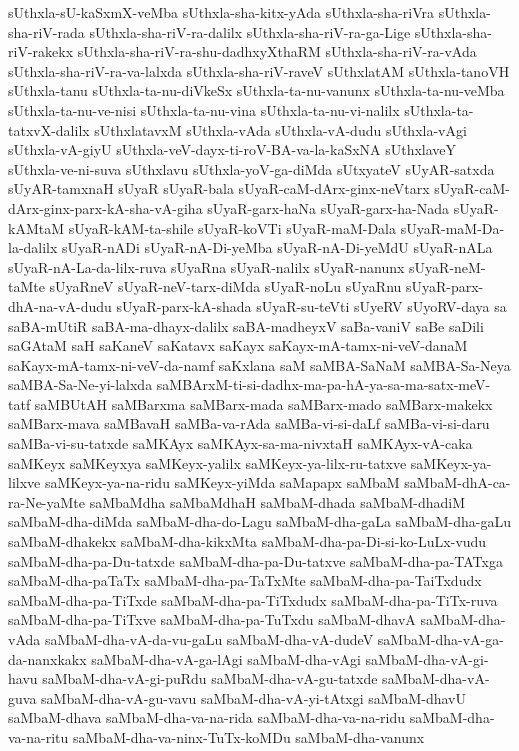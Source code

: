 {sUthxla-sU-kaSxmX-veMba
sUthxla-sha-kitx-yAda
sUthxla-sha-riVra
sUthxla-sha-riV-rada
sUthxla-sha-riV-ra-dalilx
sUthxla-sha-riV-ra-ga-Lige
sUthxla-sha-riV-rakekx
sUthxla-sha-riV-ra-shu-dadhxyXthaRM
sUthxla-sha-riV-ra-vAda
sUthxla-sha-riV-ra-va-lalxda
sUthxla-sha-riV-raveV
sUthxlatAM
sUthxla-tanoVH
sUthxla-tanu
sUthxla-ta-nu-diVkeSx
sUthxla-ta-nu-vanunx
sUthxla-ta-nu-veMba
sUthxla-ta-nu-ve-nisi
sUthxla-ta-nu-vina
sUthxla-ta-nu-vi-nalilx
sUthxla-ta-tatxvX-dalilx
sUthxlatavxM
sUthxla-vAda
sUthxla-vA-dudu
sUthxla-vAgi
sUthxla-vA-giyU
sUthxla-veV-dayx-ti-roV-BA-va-la-kaSxNA
sUthxlaveY
sUthxla-ve-ni-suva
sUthxlavu
sUthxla-yoV-ga-diMda
sUtxyateV
sUyAR-satxda
sUyAR-tamxnaH
sUyaR
sUyaR-bala
sUyaR-caM-dArx-ginx-neVtarx
sUyaR-caM-dArx-ginx-parx-kA-sha-vA-giha
sUyaR-garx-haNa
sUyaR-garx-ha-Nada
sUyaR-kAMtaM
sUyaR-kAM-ta-shile
sUyaR-koVTi
sUyaR-maM-Dala
sUyaR-maM-Da-la-dalilx
sUyaR-nADi
sUyaR-nA-Di-yeMba
sUyaR-nA-Di-yeMdU
sUyaR-nALa
sUyaR-nA-La-da-lilx-ruva
sUyaRna
sUyaR-nalilx
sUyaR-nanunx
sUyaR-neM-taMte
sUyaRneV
sUyaR-neV-tarx-diMda
sUyaR-noLu
sUyaRnu
sUyaR-parx-dhA-na-vA-dudu
sUyaR-parx-kA-shada
sUyaR-su-teVti
sUyeRV
sUyoRV-daya
sa
saBA-mUtiR
saBA-ma-dhayx-dalilx
saBA-madheyxV
saBa-vaniV
saBe
saDili
saGAtaM
saH
saKaneV
saKatavx
saKayx
saKayx-mA-tamx-ni-veV-danaM
saKayx-mA-tamx-ni-veV-da-namf
saKxlana
saM
saMBA-SaNaM
saMBA-Sa-Neya
saMBA-Sa-Ne-yi-lalxda
saMBArxM-ti-si-dadhx-ma-pa-hA-ya-sa-ma-satx-meV-tatf
saMBUtAH
saMBarxma
saMBarx-mada
saMBarx-mado
saMBarx-makekx
saMBarx-mava
saMBavaH
saMBa-va-rAda
saMBa-vi-si-daLf
saMBa-vi-si-daru
saMBa-vi-su-tatxde
saMKAyx
saMKAyx-sa-ma-nivxtaH
saMKAyx-vA-caka
saMKeyx
saMKeyxya
saMKeyx-yalilx
saMKeyx-ya-lilx-ru-tatxve
saMKeyx-ya-lilxve
saMKeyx-ya-na-ridu
saMKeyx-yiMda
saMapapx
saMbaM
saMbaM-dhA-ca-ra-Ne-yaMte
saMbaMdha
saMbaMdhaH
saMbaM-dhada
saMbaM-dhadiM
saMbaM-dha-diMda
saMbaM-dha-do-Lagu
saMbaM-dha-gaLa
saMbaM-dha-gaLu
saMbaM-dhakekx
saMbaM-dha-kikxMta
saMbaM-dha-pa-Di-si-ko-LuLx-vudu
saMbaM-dha-pa-Du-tatxde
saMbaM-dha-pa-Du-tatxve
saMbaM-dha-pa-TATxga
saMbaM-dha-paTaTx
saMbaM-dha-pa-TaTxMte
saMbaM-dha-pa-TaiTxdudx
saMbaM-dha-pa-TiTxde
saMbaM-dha-pa-TiTxdudx
saMbaM-dha-pa-TiTx-ruva
saMbaM-dha-pa-TiTxve
saMbaM-dha-pa-TuTxdu
saMbaM-dhavA
saMbaM-dha-vAda
saMbaM-dha-vA-da-vu-gaLu
saMbaM-dha-vA-dudeV
saMbaM-dha-vA-ga-da-nanxkakx
saMbaM-dha-vA-ga-lAgi
saMbaM-dha-vAgi
saMbaM-dha-vA-gi-havu
saMbaM-dha-vA-gi-puRdu
saMbaM-dha-vA-gu-tatxde
saMbaM-dha-vA-guva
saMbaM-dha-vA-gu-vavu
saMbaM-dha-vA-yi-tAtxgi
saMbaM-dhavU
saMbaM-dhava
saMbaM-dha-va-na-rida
saMbaM-dha-va-na-ridu
saMbaM-dha-va-na-ritu
saMbaM-dha-va-ninx-TuTx-koMDu
saMbaM-dha-vanunx
}
